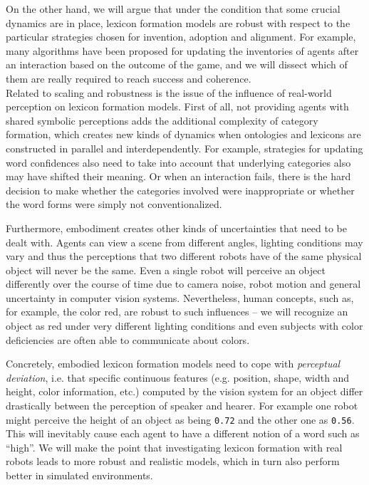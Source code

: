 On the other hand, we will argue that under the condition that some
crucial dynamics are in place, lexicon formation models are robust
with respect to the particular strategies chosen for invention,
adoption and alignment. For example, many algorithms have been
proposed for updating the inventories of agents after an interaction
based on the outcome of the game, and we will dissect which of them
are really required to reach success and coherence. \\


\noindent Related to scaling and robustness is the issue of the
influence of real-world perception on lexicon formation models. First
of all, not providing agents with shared symbolic perceptions adds the
additional complexity of category formation, which creates new kinds
of dynamics when ontologies and lexicons are constructed in parallel
and interdependently. For example, strategies for updating word
confidences also need to take into account that underlying categories
also may have shifted their meaning. Or when an interaction fails,
there is the hard decision to make whether the categories involved
were inappropriate or whether the word forms were simply not
conventionalized.
 
Furthermore, embodiment creates other kinds of uncertainties that need
to be dealt with. Agents can view a scene from different angles,
lighting conditions may vary and thus the perceptions that two
different robots have of the same physical object will never be the
same. Even a single robot will perceive an object differently over the
course of time due to camera noise, robot motion and general
uncertainty in computer vision systems. Nevertheless, human concepts,
such as, for example, the color red, are robust to such influences --
we will recognize an object as red under very different lighting
conditions and even subjects with color deficiencies are often able to
communicate about colors.

Concretely, embodied lexicon formation models need to cope with
\emph{perceptual deviation}, i.e. that specific continuous features
(e.g. position, shape, width and height, color information, etc.)
computed by the vision system for an object differ drastically between
the perception of speaker and hearer. For example one robot might
perceive the height of an object as being {\tt 0.72} and the other one
as {\tt 0.56}. This will inevitably cause each agent to have a
different notion of a word such as ``high''. We will make the point
that investigating lexicon formation with real robots leads to more
robust and realistic models, which in turn also perform better in
simulated environments.







